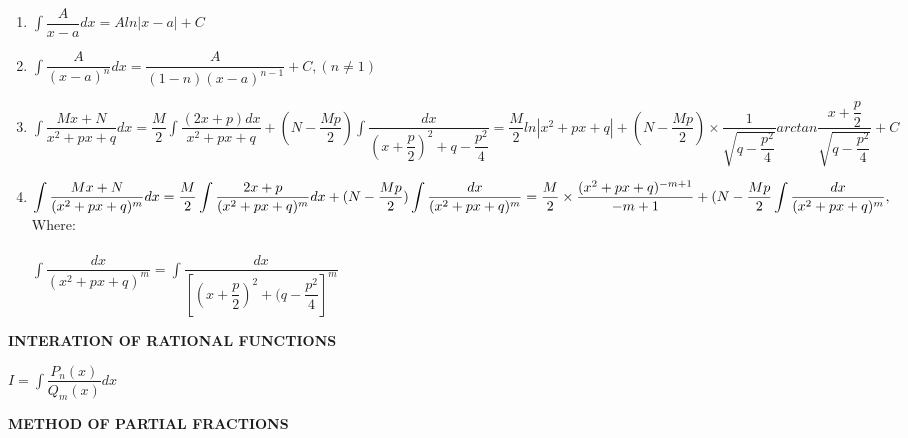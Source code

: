 \documentclass[10pt]{article}
\begin{document}
\begin{enumerate}
	\item $\displaystyle \int \dfrac{A}{x-a}dx=Aln|x-a| +C$
	\item $\displaystyle \int \dfrac{A}{(x-a)^n}dx= \dfrac{A}{(1-n)(x-a)^{n-1}}+C,(n \not = 1)$
	\item $\displaystyle \int\dfrac{Mx+N}{x^2+px+q}dx= \dfrac{M}{2} \int \dfrac{(2x+p)dx}{x^2+px+q} + (N - \dfrac{Mp}{2}) \int \dfrac{dx}{\displaystyle(x+ \dfrac{p}{2})^2+q- \dfrac{p^2}{4}} = \dfrac{M}{2} ln|x^2+px+q|+(N- \dfrac{Mp}{2}) \times \dfrac{1}{\sqrt{q- \dfrac{p^2}{4}}} arctan \dfrac{x+ \dfrac{p}{2}}{\sqrt{q- \dfrac{p^2}{4}}} +C$
	\item $ \displaystyle \int \dfrac{Mx+N}{(x^2+px+q)^m}dx = \dfrac{M}{2} \int \dfrac{2x+p}{(x^2+px+q)^m}dx + (N - \dfrac{Mp}{2}) \int \dfrac{dx}{(x^2+px+q)^m}\\
 = \dfrac{M}{2} \times \dfrac{(x^2+px+q)^{-m+1}}{-m+1} + (N- \dfrac{Mp}{2} \int \dfrac{dx}{(x^2+px+q)^m},$\\
	Where:\\
\\
	$\int \dfrac{dx}{(x^2+px+q)^m} = \int \dfrac{dx}{\left[(x+ \dfrac{p}{2})^2 + (q- \dfrac{p^2}{4}\right]^m}$ 
\end{enumerate}
\textbf{INTERATION OF RATIONAL FUNCTIONS}\\
\begin{center}
$I= \displaystyle \int \dfrac{P_n(x)}{Q_m(x)}dx$
\end{center}
\textbf{METHOD OF PARTIAL FRACTIONS}
\end{document}
